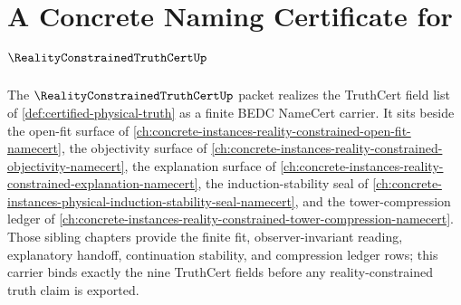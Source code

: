 \chapter{A Concrete Naming Certificate for $\RealityConstrainedTruthCertUp$}
\label{ch:concrete-instances-reality-constrained-truth-cert-namecert}

The $\RealityConstrainedTruthCertUp$ packet realizes the TruthCert field list of \autoref{def:certified-physical-truth} as a finite BEDC NameCert carrier. It sits beside the open-fit surface of \autoref{ch:concrete-instances-reality-constrained-open-fit-namecert}, the objectivity surface of \autoref{ch:concrete-instances-reality-constrained-objectivity-namecert}, the explanation surface of \autoref{ch:concrete-instances-reality-constrained-explanation-namecert}, the induction-stability seal of \autoref{ch:concrete-instances-physical-induction-stability-seal-namecert}, and the tower-compression ledger of \autoref{ch:concrete-instances-reality-constrained-tower-compression-namecert}. Those sibling chapters provide the finite fit, observer-invariant reading, explanatory handoff, continuation stability, and compression ledger rows; this carrier binds exactly the nine TruthCert fields before any reality-constrained truth claim is exported.

